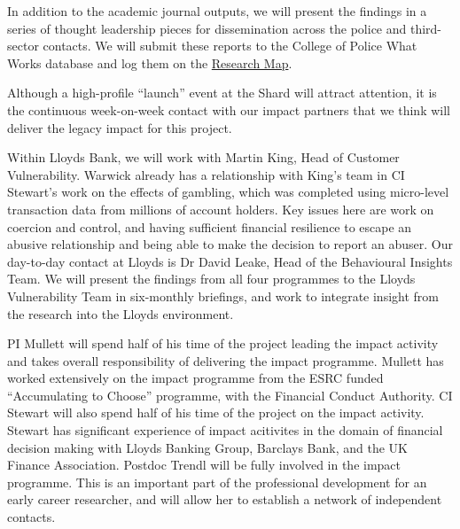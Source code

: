 \documentclass[11pt, a4paper]{article}
\newcommand{\TM}[1] {{\textcolor{orange}{#1}}}
\begin{document}
In addition to the academic journal outputs, we will present the findings in a series of thought leadership pieces for dissemination across the police and third-sector contacts. We will submit these reports to the College of Police What Works database and log them on the \href{https://whatworks.college.police.uk/Research/Research-Map/Pages/Research-Map.aspx}{Research Map}.

Although a high-profile ``launch'' event at the Shard will attract attention, it is the continuous week-on-week contact with our impact partners that we think will deliver the legacy impact for this project.


Within Lloyds Bank, we will work with Martin King, Head of Customer Vulnerability. Warwick already has a relationship with King's team in CI Stewart's work on the effects of gambling, which was completed using micro-level transaction data from millions of account holders. Key issues here are work on coercion and control, and having sufficient financial resilience to escape an abusive relationship and being able to make the decision to report an abuser. Our day-to-day contact at Lloyds is Dr David Leake, Head of the Behavioural Insights Team. We will present the findings from all four programmes to the Lloyds Vulnerability Team in six-monthly briefings, and work to integrate insight from the research into the Lloyds environment. 









PI Mullett will spend half of his time of the project leading the impact activity and takes overall responsibility of delivering the impact programme. Mullett has worked extensively on the impact programme from the ESRC funded ``Accumulating to Choose'' programme, with the Financial Conduct Authority. CI Stewart will also spend half of his time of the project on the impact activity. Stewart has significant experience of impact acitivites in the domain of financial decision making with Lloyds Banking Group, Barclays Bank, and the UK Finance Association. Postdoc Trendl will be fully involved in the impact programme. This is an important part of the professional development for an early career researcher, and will allow her to establish a network of independent contacts. 
\end{document}
